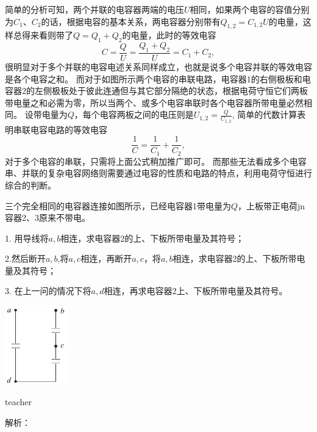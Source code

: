 简单的分析可知，两个并联的电容器两端的电压$U$相同，如果两个电容的容值分别为$C_1$、$C_2$的话，根据电容的基本关系，两电容器分别带有$Q_{1,2} = C_{1,2}U$的电量，这样总得来看则带了$Q=Q_1+Q_2$的电量，此时的等效电容
\begin{equation}
C = \frac{Q}{U} = \frac{Q_1+Q_2}{U} = C_1+C_2,
\end{equation}
很明显对于多个并联的电容电述关系同样成立，也就是说多个电容并联的等效电容是各个电容之和。
而对于如图所示两个电容的串联电路，电容器1的右侧极板和电容器2的左侧极板处于彼此连通但与其它部分隔绝的状态，根据电荷守恒它们两板带电量之和必需为零，所以当两个、或多个电容串联时各个电容器所带电量必然相同。
设带电量为$Q$，每个电容两板之间的电压则是$U_{1,2} = \frac{Q}{C_{1,2}}$,
简单的代数计算表明串联电容电路的等效电容
\begin{equation}
\frac{1}{C} = \frac{1}{C_1}+\frac{1}{C_2},  
\end{equation}
对于多个电容的串联，只需将上面公式稍加推广即可。
而那些无法看成多个电容串、并联的复杂电容网络则需要通过电容的性质和电路的特点，利用电荷守恒进行综合的判断。




\begin{example}

三个完全相同的电容器连接如图所示，已经电容器1带电量为$Q$，上板带正电荷jn容器2、3原来不带电。

1. 用导线将$a,b$相连，求电容器2的上、下板所带电量及其符号；

2.然后断开$a,b$,将$a,c$相连，再断开$a,c$，将$a,b$相连，求电容器2的上、下板所带电量及其符号；

3. 在上一问的情况下将$a,d$相连，再求电容器2上、下板所带电量及其符号。
\begin{flushright}
\includegraphics[width = 0.2\textwidth]{images/elec-problem-15.pdf} 
\end{flushright}
\begin{taggedblock}{teacher}

解析：
\end{taggedblock}
\end{example}


